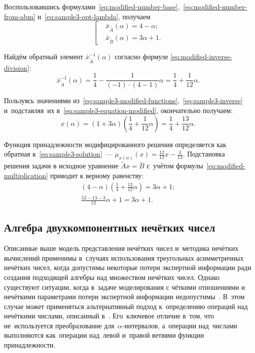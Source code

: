 Воспользовавшись формулами~\eqref{eq:modified-number-base},~\eqref{eq:modified-number-from-abm} и~\eqref{eq:sample3-opt-lambda}, получаем
\begin{equation}
\label{eq:sample3-modified-functions}
  \left[ \begin{aligned}
    & \bar{x}_{\tilde A}\left( \alpha  \right)=4-\alpha;  \\ 
    & \bar{x}_{\tilde B}\left( \alpha  \right)=3\alpha+1.
  \end{aligned} \right.
\end{equation}

Найдём обратный элемент $\bar{x}_{\tilde A}^{-1}\left( \alpha  \right)$ согласно формуле \eqref{eq:modified-inverse-division}: 
\begin{equation}
\label{eq:sample3-inverse}
  \bar{x}_{\tilde A}^{-1}\left(\alpha \right)=\frac{1}{4}-\frac{1}{\left( -1 \right)\cdot \left( 4-1 \right)}\alpha =\frac{1}{4}+\frac{1}{12}\alpha.\end{equation}

Пользуясь значениями из~\eqref{eq:sample3-modified-functions},~\eqref{eq:sample3-inverse} и~подставляя~их в~\eqref{eq:sample3-equation-modified}, окончательно получаем:
\begin{equation}
\label{eq:sample3-solution}
  x\left( \alpha  \right)=\left( 1+3\alpha  \right)\left( \frac{1}{4}+\frac{1}{12}\alpha  \right)=\frac{1}{4}+\frac{13}{12}\alpha.
\end{equation}

Функция принадлежности модифицированного решения определяется как обратная к~\eqref{eq:sample3-solution}~--- $\displaystyle \mu_{x\left(\alpha \right)}\left(x \right)=\frac{12}{13}x-\frac{3}{13}$. Подстановка решения задачи в исходное уравнение $\tilde{A}x=\tilde{B}$ с~учётом формулы~\eqref{eq:modified-multiplication} приводит к верному равенству:
\begin{gather*}
  \left( 4-\alpha  \right)\left( \frac{1}{4}+\frac{13}{12}\alpha  \right)=3\alpha +1; \\
  \frac{52-13-3}{12}\alpha +1=3\alpha +1.  
\end{gather*}

\subsection{Алгебра двухкомпонентных нечётких чисел}

Описанные выше модель представления нечётких чисел и~методика нечётких вычислений применимы в~случаях использования треугольных асимметричных нечётких чисел, когда допустимы некоторые потери экспертной информации ради создания подходящей алгебры над множеством нечётких чисел. Однако существуют ситуации, когда в~задаче моделирования с чёткими отношениями и нечёткими параметрами потери экспертной информации недопустимы~\cite{Hanss_Engineering}. В~этом случае может применяться альтернативный подход к~определению операций над нечёткими числами, описанный в~\cite{Kanischeva}. Его~ключевое отличие в~том, что не~используется преобразование для~$\alpha$-интервалов, а~операции над~числами выполняются как~операции над~левой и~правой ветвями функции принадлежности.

